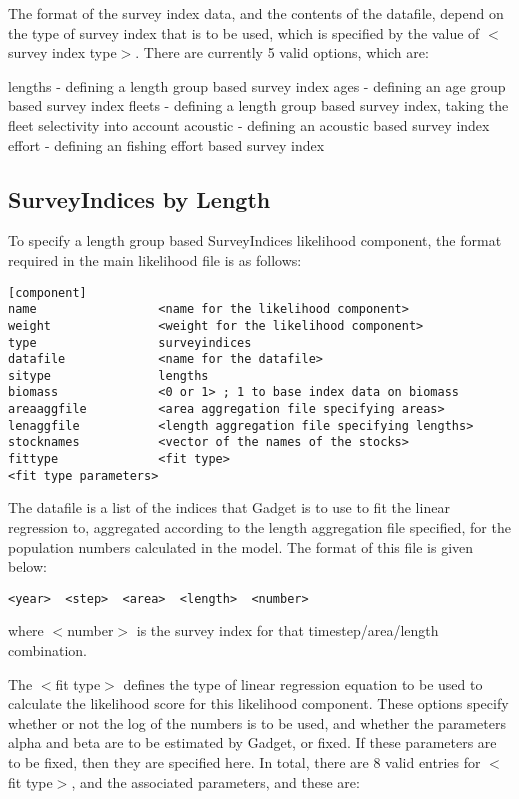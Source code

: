 \documentclass[10pt,twoside]{book}
\begin{document}
\bigskip
The format of the survey index data, and the contents of the datafile, depend on the type of survey index that is to be used, which is specified by the value of $<$survey index type$>$.  There are currently 5 valid options, which are:

\bigskip
lengths - defining a length group based survey index\newline
ages - defining an age group based survey index\newline
fleets - defining a length group based survey index, taking the fleet selectivity into account\newline
acoustic - defining an acoustic based survey index\newline
effort - defining an fishing effort based survey index

\subsection{SurveyIndices by Length}\label{subsec:sibylength}
To specify a length group based SurveyIndices likelihood component, the format required in the main likelihood file is as follows:

{\small\begin{verbatim}
[component]
name                 <name for the likelihood component>
weight               <weight for the likelihood component>
type                 surveyindices
datafile             <name for the datafile>
sitype               lengths
biomass              <0 or 1> ; 1 to base index data on biomass
areaaggfile          <area aggregation file specifying areas>
lenaggfile           <length aggregation file specifying lengths>
stocknames           <vector of the names of the stocks>
fittype              <fit type>
<fit type parameters>
\end{verbatim}}

The datafile is a list of the indices that Gadget is to use to fit the linear regression to, aggregated according to the length aggregation file specified, for the population numbers calculated in the model.  The format of this file is given below:

{\small\begin{verbatim}
<year>  <step>  <area>  <length>  <number>
\end{verbatim}}

where $<$number$>$ is the survey index for that timestep/area/length combination.

\bigskip
The $<$fit type$>$ defines the type of linear regression equation to be used to calculate the likelihood score for this likelihood component.  These options specify whether or not the log of the numbers is to be used, and whether the parameters alpha and beta are to be estimated by Gadget, or fixed.  If these parameters are to be fixed, then they are specified here.  In total, there are 8 valid entries for $<$fit type$>$, and the associated parameters, and these are:
\end{document}
